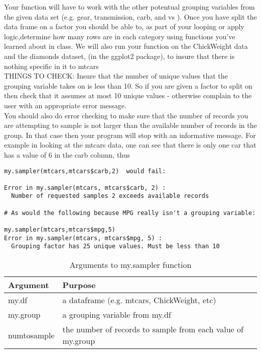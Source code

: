 \documentclass{article}
\begin{document}
Your function will have to work with the other potentual grouping variables from the given data set (e.g. gear, transmission,  carb, and vs ). Once you have split the data frame on a factor you should be able to, as part of your looping or apply logic,determine how many rows are in each category using functions you've learned about in class. We will also run your function on the ChickWeight data and the diamonds dataset, (in the ggplot2 package), to insure that there is nothing specific in it to mtcars
\\

THINGS TO CHECK: Insure that the number of unique values that the grouping variable takes on is less than 10. So if you are given a factor to split on then check that it assumes at most 10 unique values - otherwise complain to the user with an appropriate error message. 
\\

You should also do error checking to make sure that the number of records you are attempting to sample is not larger than the available number of records in the group. In that case then your program will stop with an informative message. For example in looking at the mtcars data, one can see that there is only one car that has a value of 6 in the carb column, thus
\begin{verbatim}
my.sampler(mtcars,mtcars$carb,2)  would fail:

Error in my.sampler(mtcars, mtcars$carb, 2) : 
  Number of requested samples 2 exceeds available records 

# As would the following because MPG really isn't a grouping variable:

my.sampler(mtcars,mtcars$mpg,5)
Error in my.sampler(mtcars, mtcars$mpg, 5) : 
  Grouping factor has 25 unique values. Must be less than 10
\end{verbatim}

\begin{table}[ht]
\caption{Arguments to my.sampler function}
\begin{tabular}{l | l}
\hline\hline
Argument & Purpose \\ [1ex]
\hline
my.df & a dataframe (e.g. mtcars, ChickWeight, etc) \\ [1ex]
\hline 
my.group & a grouping variable from my.df \\ [1ex]
\hline
numtosample & the number of records to sample from each value of my.group \\ [1ex]
\hline 
\end{tabular}
\label{table:nonlin}
\end{table}
\end{document}

